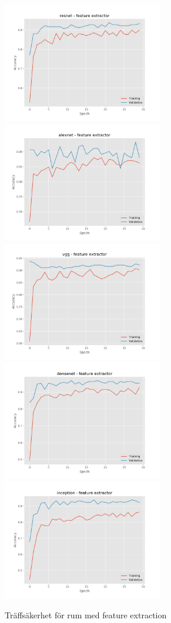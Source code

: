 \documentclass[]{kththesis}
\begin{document}
  \begin{figure}[h]
    \includegraphics[width=7cm]{r_a_resnet_fe}
    \includegraphics[width=7cm]{r_a_alexnet_fe}
    \includegraphics[width=7cm]{r_a_vgg_fe}
    \includegraphics[width=7cm]{r_a_densenet_fe}
    \includegraphics[width=7cm]{r_a_inception_fe}
    \caption{Träffsäkerhet för rum med feature extraction}
    \label{fig:r_a_1}
  \end{figure}
  
\end{document}
